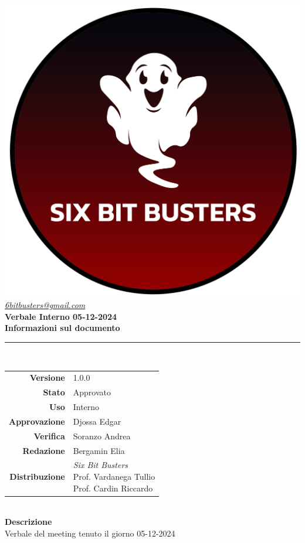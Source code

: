 \thispagestyle{empty}
\renewcommand{\arraystretch}{1.3}


\begin{titlepage}
	\begin{center}
		
	\includegraphics[scale = 0.7]{template/images/logo-circle.png}
	\\[1cm]
	\href{mailto:6bitbusters@gmail.com}		      	
	{\large{\textit{6bitbusters@gmail.com} } }\\[1cm]
	
	\Huge \textbf{Verbale Interno 05-12-2024} \\[1cm]

	\large \textbf{Informazioni sul documento} \\
	\rule{0.6\textwidth}{0.4pt}
	\\[0.5cm]
	\begin{tabular}{r|l}
		\textbf{Versione} & 1.0.0\\
		\textbf{Stato} & Approvato\\
		\textbf{Uso} & Interno\\                         
		\textbf{Approvazione} & Djossa Edgar\\                      
		\textbf{Verifica} & Soranzo Andrea \\                         
		\textbf{Redazione} & Bergamin Elia \\ 
		\textbf{Distribuzione} & \parbox[t]{5cm}{ \textit{Six Bit Busters} \\ Prof. Vardanega Tullio 
	 \\ Prof. Cardin Riccardo}
	\end{tabular}	
	\\[1.2cm]

	\large \textbf{Descrizione} \\
	Verbale del meeting tenuto il giorno 05-12-2024 
	
	\end{center}
\end{titlepage}
